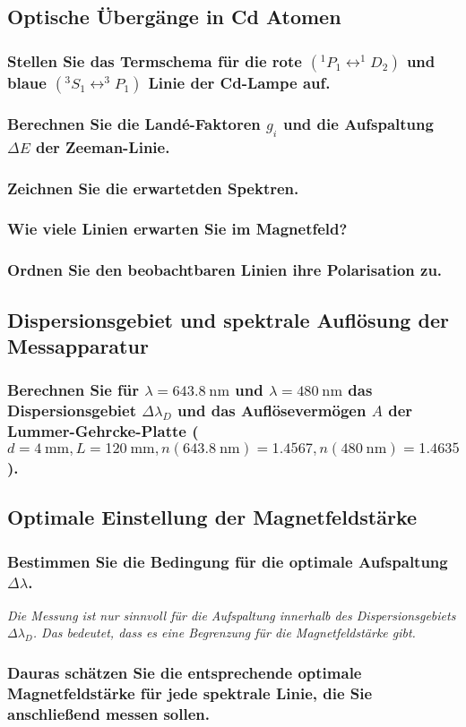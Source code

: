 \subsection{Optische Übergänge in Cd Atomen}
\subsubsection[]{Stellen Sie das Termschema für die rote $(^1P_1 \leftrightarrow ^1D_2)$ und blaue 
$(^3S_1 \leftrightarrow ^3P_1)$ Linie der Cd-Lampe auf.}
\subsubsection[]{Berechnen Sie die Landé-Faktoren $g_i$ und die Aufspaltung $\Delta E$ der Zeeman-Linie.}
\subsubsection{Zeichnen Sie die erwartetden Spektren.}
\subsubsection{Wie viele Linien erwarten Sie im Magnetfeld?}
\subsubsection{Ordnen Sie den beobachtbaren Linien ihre Polarisation zu.}
\subsection{Dispersionsgebiet und spektrale Auflösung der Messapparatur}
\subsubsection[]{Berechnen Sie für $\lambda=\SI{643.8}{\nano\metre}$ und $\lambda=\SI{480}{\nano\metre}$ das Dispersionsgebiet 
$\Delta\lambda_D$  und das Auflösevermögen $A$ der Lummer-Gehrcke-Platte ($d=\SI{4}{\milli\metre}, L=\SI{120}{\milli\metre}, 
n(\SI{643.8}{\nano\metre})=\num{1.4567}, n(\SI{480}{\nano\metre})=\num{1.4635}$).}
\subsection{Optimale Einstellung der Magnetfeldstärke}
\subsubsection[]{Bestimmen Sie die Bedingung für die optimale Aufspaltung $\Delta\lambda$.}
\textit{Die Messung ist nur sinnvoll für die Aufspaltung innerhalb des Dispersionsgebiets $\Delta\lambda_D$. Das bedeutet, dass 
es eine Begrenzung für die Magnetfeldstärke gibt.}
\subsubsection{Dauras schätzen Sie die entsprechende optimale Magnetfeldstärke für jede spektrale Linie, die Sie anschließend
messen sollen.}